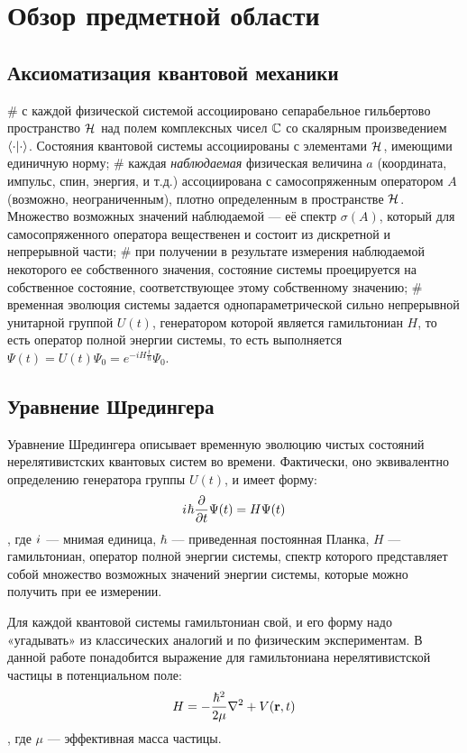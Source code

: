 \chapter{Обзор предметной области}
\label{chapter1}

\section{Аксиоматизация квантовой механики}
\begin{easylist}[itemize]
# с каждой физической системой ассоциировано сепарабельное гильбертово пространство $\mathcal{H}_{}$ над полем комплексных чисел $\mathbb{C}$ со скалярным произведением $\ipcdot$. Состояния квантовой системы ассоциированы с элементами $\mathcal{H}_{}$, имеющими единичную норму;
# каждая \textit{наблюдаемая} физическая величина $a$ (координата, импульс, спин, энергия, и т.д.) ассоциирована с самосопряженным оператором $A$ (возможно, неограниченным), плотно определенным в пространстве $\mathcal{H}_{}$. Множество возможных значений наблюдаемой — её спектр $\sigma(A)$, который для самосопряженного оператора вещественен и состоит из дискретной и непрерывной части;
# при получении в результате измерения наблюдаемой некоторого ее собственного значения, состояние системы проецируется на собственное состояние, соответствующее этому собственному значению;
# временная эволюция системы задается однопараметрической сильно непрерывной унитарной группой $U(t)$, генератором которой является гамильтониан $H$, то есть оператор полной энергии системы, то есть выполняется $\Psi(t) = U(t) \Psi_0 = e^{-i H \frac{t}{\hbar}} \Psi_0$.
\end{easylist}

\section{Уравнение Шредингера}
Уравнение Шредингера описывает временную эволюцию чистых состояний нерелятивистских квантовых систем во времени. Фактически, оно эквивалентно определению генератора группы $U(t)$, и имеет форму:
\[
{i\mkern1mu} \hbar \pdv{t} \Psi(t) = H \Psi(t)
\]
, где ${i\mkern1mu}$ — мнимая единица, $\hbar$ — приведенная постоянная Планка, $H$ — гамильтониан, оператор полной энергии системы, спектр которого представляет собой множество возможных значений энергии системы, которые можно получить при ее измерении.

Для каждой квантовой системы гамильтониан свой, и его форму надо «угадывать» из классических аналогий и по физическим экспериментам. В данной работе понадобится выражение для гамильтониана нерелятивистской частицы в потенциальном поле:
\[
H = - \frac{\hbar^2}{2 \mu} \laplacian + V(\vb{r}, t)
\],
где $\mu$ — эффективная масса частицы.

